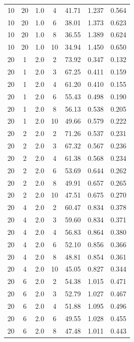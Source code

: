 \documentclass[11pt,a4paper]{article}
\begin{document}
\begin{longtable}{ccccccc}
        10 &  20  &  1.0  & 4 & 41.71 & 1.237 & 0.564 \\
        10 &  20  &  1.0  & 6 & 38.01 & 1.373 & 0.623 \\
        10 &  20  &  1.0  & 8 & 36.55 & 1.389 & 0.624 \\
        10 &  20  &  1.0  & 10 & 34.94 & 1.450 & 0.650 \\
        \midrule
        \midrule
        20 &  1  &  2.0  & 2 & 73.92 & 0.347 & 0.132 \\
        20 &  1  &  2.0  & 3 & 67.25 & 0.411 & 0.159 \\
        20 &  1  &  2.0  & 4 & 61.20 & 0.410 & 0.155 \\
        20 &  1  &  2.0  & 6 & 55.43 & 0.498 & 0.190 \\
        20 &  1  &  2.0  & 8 & 56.13 & 0.538 & 0.205 \\
        20 &  1  &  2.0  & 10 & 49.66 & 0.579 & 0.222 \\
        \midrule
        20 &  2  &  2.0  & 2 & 71.26 & 0.537 & 0.231 \\
        20 &  2  &  2.0  & 3 & 67.32 & 0.567 & 0.236 \\
        20 &  2  &  2.0  & 4 & 61.38 & 0.568 & 0.234 \\
        20 &  2  &  2.0  & 6 & 53.69 & 0.644 & 0.262 \\
        20 &  2  &  2.0  & 8 & 49.91 & 0.657 & 0.265 \\
        20 &  2  &  2.0  & 10 & 47.51 & 0.675 & 0.270 \\
        \midrule
        20 &  4  &  2.0  & 2 & 60.47 & 0.834 & 0.378 \\
        20 &  4  &  2.0  & 3 & 59.60 & 0.834 & 0.371 \\
        20 &  4  &  2.0  & 4 & 56.83 & 0.864 & 0.380 \\
        20 &  4  &  2.0  & 6 & 52.10 & 0.856 & 0.366 \\
        20 &  4  &  2.0  & 8 & 48.81 & 0.854 & 0.361 \\
        20 &  4  &  2.0  & 10 & 45.05 & 0.827 & 0.344 \\
        \midrule
        20 &  6  &  2.0  & 2 & 54.38 & 1.015 & 0.471 \\
        20 &  6  &  2.0  & 3 & 52.79 & 1.027 & 0.467 \\
        20 &  6  &  2.0  & 4 & 51.88 & 1.095 & 0.496 \\
        20 &  6  &  2.0  & 6 & 49.55 & 1.028 & 0.455 \\
        20 &  6  &  2.0  & 8 & 47.48 & 1.011 & 0.443 \\

\end{longtable}
\end{document}
